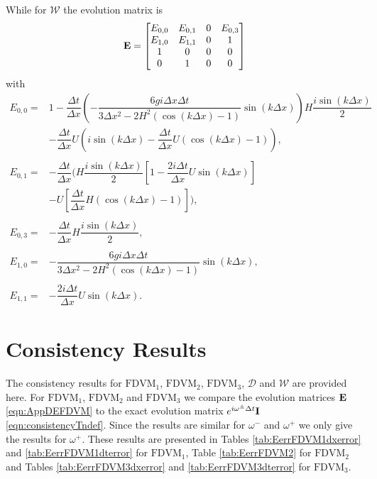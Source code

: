 While for $\mathcal{W}$ the evolution matrix is 
\begin{equation}
\label{eqn:AppEvolW}
\mathbf{E} = \begin{bmatrix}
{E}_{0,0} & {E}_{0,1} & 0 & E_{0,3} \\
{E}_{1,0} & E_{1,1} &0 & 1 \\
1&0&0&0\\
0&1&0&0
\end{bmatrix}
\end{equation}
with
\begin{align*}
{E}_{0,0} = &1 - \dfrac{\Delta t}{\Delta x}\left(-\dfrac{6 gi \Delta x\Delta t}{3 \Delta x^2 -2{H^2} \left( \cos\left(k \Delta x\right) - 1 \right)}{ \sin\left(k \Delta x\right)}\right)H\dfrac{i\sin\left(k\Delta x\right)}{2} \\  & - \dfrac{\Delta t}{\Delta x}U\left(i\sin\left(k\Delta x\right) - \dfrac{\Delta t}{\Delta x}U\left(\cos\left(k\Delta x\right) - 1\right)\right), \\ \\
{E}_{0,1} = &- \dfrac{\Delta t}{\Delta x} \Bigg(H\dfrac{i\sin\left(k\Delta x\right)}{2}\left[ 1 -\dfrac{2i \Delta t }{\Delta x} U \sin\left(k \Delta x\right) \right] \\ & -U\left[\dfrac{\Delta t}{\Delta x}H\left(\cos\left(k\Delta x\right) - 1\right)\right] \Bigg),\\ \\
E_{0,3} = &- \dfrac{\Delta t}{\Delta x}H\dfrac{i\sin\left(k\Delta x\right)}{2},  \\ \\
 {E}_{1,0} = &-\dfrac{6 gi \Delta x\Delta t}{3 \Delta x^2 -2{H^2} \left( \cos\left(k \Delta x\right) - 1 \right)}{ \sin\left(k \Delta x\right)}, \\ \\
{E}_{1,1} = &-\dfrac{2i \Delta t }{\Delta x} U \sin\left(k \Delta x\right).
\end{align*}

\section{Consistency Results}
The consistency results for $\text{FDVM}_1$, $\text{FDVM}_2$, $\text{FDVM}_3$, $\mathcal{D}$ and $\mathcal{W}$ are provided here. For $\text{FDVM}_1$, $\text{FDVM}_2$ and $\text{FDVM}_3$ we compare the evolution matrices $\mathbf{E}$ \eqref{eqn:AppDEFDVM} to the exact evolution matrix $e^{i\omega^\pm \Delta t } \mathbf{I}$ \eqref{eqn:consistencyTndef}. Since the results are similar for $\omega^-$ and $\omega^+$ we only give the results for $\omega^+$. These results are presented in Tables \ref{tab:EerrFDVM1dxerror} and \ref{tab:EerrFDVM1dterror} for $\text{FDVM}_1$, Table \ref{tab:EerrFDVM2} for $\text{FDVM}_2$ and Tables \ref{tab:EerrFDVM3dxerror} and \ref{tab:EerrFDVM3dterror} for $\text{FDVM}_3$.


